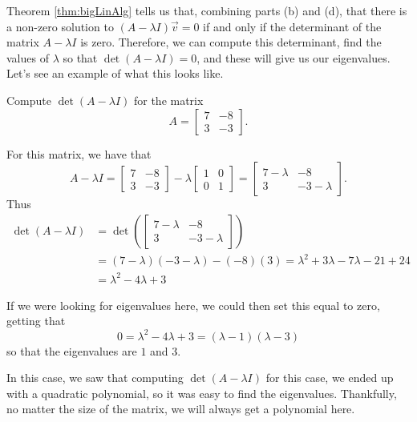 Theorem \ref{thm:bigLinAlg} tells us that, combining parts (b) and (d), that there is a non-zero solution to $(A - \lambda I)\vec{v} = 0$ if and only if the determinant of the matrix $A - \lambda I$ is zero. Therefore, we can compute this determinant, find the values of $\lambda$ so that $\det(A - \lambda I) = 0$, and these will give us our eigenvalues. Let's see an example of what this looks like.

\begin{example}
Compute $\det(A - \lambda I)$ for the matrix \[ A = \begin{bmatrix} 7 & -8 \\ 3 & -3 \end{bmatrix}.\]
\end{example}

\begin{exampleSol}
For this matrix, we have that 
\[ A - \lambda I = \begin{bmatrix} 7 & -8 \\ 3 & -3 \end{bmatrix} - \lambda \begin{bmatrix} 1 & 0 \\ 0 & 1 \end{bmatrix} = \begin{bmatrix} 7-\lambda & -8 \\ 3 & -3-\lambda \end{bmatrix}. \]
Thus
\[ \begin{split}
 \det(A - \lambda I) &= \det\left(\begin{bmatrix} 7-\lambda & -8 \\ 3 & -3-\lambda \end{bmatrix}\right) \\
 &= (7-\lambda)(-3-\lambda) - (-8)(3) = \lambda^2 + 3\lambda - 7\lambda - 21 +24 \\
 &= \lambda^2 - 4\lambda + 3
 \end{split}
 \]

If we were looking for eigenvalues here, we could then set this equal to zero, getting that
\[ 0 = \lambda^2 - 4\lambda+ 3 = (\lambda -1)(\lambda -3) \] so that the eigenvalues are $1$ and $3$. 
\end{exampleSol}

In this case, we saw that computing $\det(A - \lambda I)$ for this case, we ended up with a quadratic polynomial, so it was easy to find the eigenvalues. Thankfully, no matter the size of the matrix, we will always get a polynomial here. 

